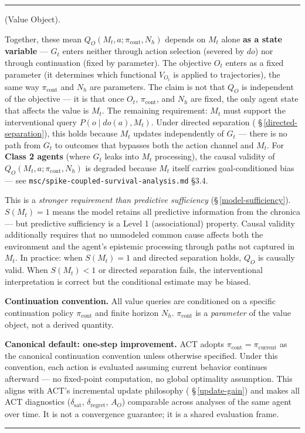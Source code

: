 \documentclass[11pt,oneside]{article}
\newcounter{claim}[section]
\renewcommand{\theclaim}{\thesection.\arabic{claim}}
\newenvironment{segment}[2]{%
  \refstepcounter{claim}%
  \bigskip\noindent\hrule\smallskip
  \noindent{\bfseries #1~\theclaim}\enskip(#2).\par\smallskip
  \noindent\ignorespaces
}{%
  \par\smallskip\noindent\hrule\bigskip
}
\newenvironment{definition}[1][]{\begin{segment}{Definition}{#1}}{\end{segment}}
\begin{document}
\begin{definition}[Value Object]
Together, these mean $Q_O(M_t, a; \pi_{\text{cont}}, N_h)$ depends on $M_t$ alone \textbf{as a state variable} — $G_t$ enters neither through action selection (severed by $do$) nor through continuation (fixed by parameter). The objective $O_t$ enters as a fixed parameter (it determines which functional $V_{O_t}$ is applied to trajectories), the same way $\pi_{\text{cont}}$ and $N_h$ are parameters. The claim is not that $Q_O$ is independent of the objective — it is that once $O_t$, $\pi_{\text{cont}}$, and $N_h$ are fixed, the only agent state that affects the value is $M_t$. The remaining requirement: $M_t$ must support the interventional query $P(o \mid do(a), M_t)$. Under directed separation ( \S\,\ref{directed-separation}), this holds because $M_t$ updates independently of $G_t$ — there is no path from $G_t$ to outcomes that bypasses both the action channel and $M_t$. For \textbf{Class 2 agents} (where $G_t$ leaks into $M_t$ processing), the causal validity of $Q_O(M_t, a; \pi_{\text{cont}}, N_h)$ is degraded because $M_t$ itself carries goal-conditioned bias — see \texttt{msc/spike-coupled-survival-analysis.md} §3.4.

This is a \textit{stronger requirement than predictive sufficiency} (\S\,\ref{model-sufficiency}). $S(M_t) = 1$ means the model retains all predictive information from the chronica — but predictive sufficiency is a Level 1 (associational) property. Causal validity additionally requires that no unmodeled common cause affects both the environment and the agent's epistemic processing through paths not captured in $M_t$. In practice: when $S(M_t) = 1$ and directed separation holds, $Q_O$ is causally valid. When $S(M_t) < 1$ or directed separation fails, the interventional interpretation is correct but the conditional estimate may be biased.

\textbf{Continuation convention.} All value queries are conditioned on a specific continuation policy $\pi_{\text{cont}}$ and finite horizon $N_h$. $\pi_{\text{cont}}$ is a \textit{parameter} of the value object, not a derived quantity.

\textbf{Canonical default: one-step improvement.} ACT adopts $\pi_{\text{cont}} = \pi_{\text{current}}$ as the canonical continuation convention unless otherwise specified. Under this convention, each action is evaluated assuming current behavior continues afterward — no fixed-point computation, no global optimality assumption. This aligns with ACT's incremental update philosophy ( \S\,\ref{update-gain}) and makes all ACT diagnostics ($\delta_{\text{sat}}$, $\delta_{\text{regret}}$, $A_O$) comparable across analyses of the same agent over time. It is not a convergence guarantee; it is a shared evaluation frame.


\end{definition}
\end{document}
